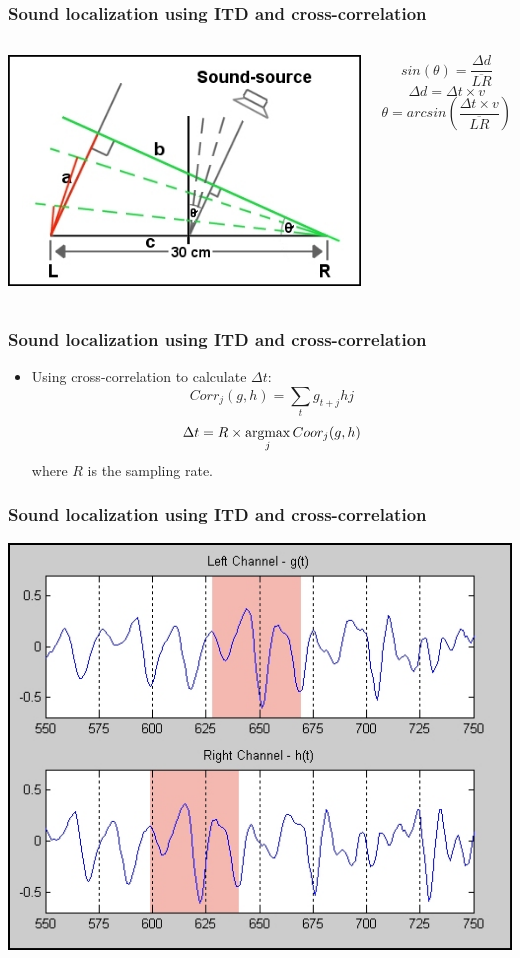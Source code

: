 \documentclass{beamer}
\newcommand*{\argmax}{\operatornamewithlimits{argmax}\limits}
\begin{document}
\begin{frame}
  \frametitle{Sound localization using ITD and cross-correlation\cite{murray_robotics_2004}}
  \begin{columns}
\begin{center}
  \includegraphics[width=\textwidth]{correl-007}
\end{center}
\[ sin(\theta) = \frac{\Delta d}{\overline{LR}} \]
\[ \Delta d = \Delta t \times v \]
\[ \theta = arcsin(\frac{\Delta t \times v}{\overline{LR}}) \]
  \end{columns}
\end{frame}

\begin{frame}
\frametitle{Sound localization using ITD and cross-correlation\cite{murray_robotics_2004}}
\begin{itemize}
  \item Using cross-correlation to calculate $\Delta t$:
  \[ Corr_j(g, h) = \sum_t g_{t+j} h{j} \]
  \[ \Delta t = R \times \argmax_{j} Coor_j(g, h) \]
  where $R$ is the sampling rate.
\end{itemize}
\end{frame}

\begin{frame}
\frametitle{Sound localization using ITD and cross-correlation\cite{murray_robotics_2004}}
\begin{center}
  \includegraphics[width=.7\textwidth]{correl-003}
\end{center}
\end{frame}
\end{document}
